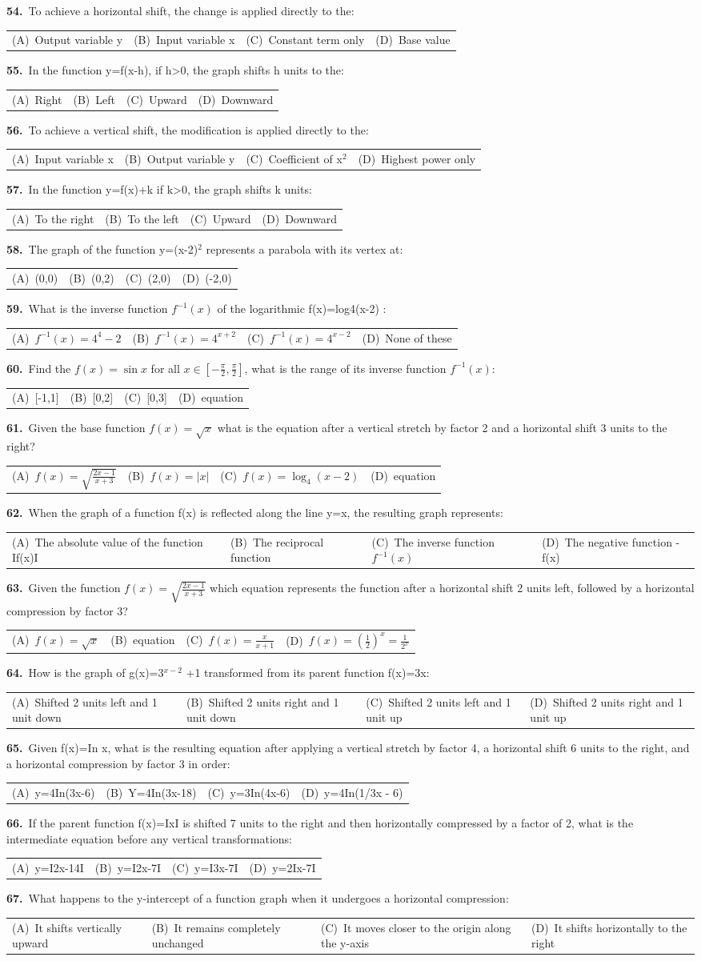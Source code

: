 \documentclass[11pt,a4paper]{article}
\makeatletter
\newcommand{\mcq}[6]{%
  \Needspace{4\baselineskip}%
  \par\medskip\noindent\textbf{#1.}\ #2\par\nopagebreak
  \noindent\begin{tabularx}{\linewidth}{@{\hspace{1.5em}}*{4}{>{\raggedright\arraybackslash}X}@{}}
    (A)~#3 & (B)~#4 & (C)~#5 & (D)~#6
  \end{tabularx}\par}
\makeatother
\begin{document}
\mcq{54}{To achieve a horizontal shift, the change is applied directly to the:}{Output variable y}{Input variable x}{Constant term only}{Base value}
\mcq{55}{In the function y=f(x-h), if h{>}0, the graph shifts h units to the:}{Right}{Left}{Upward}{Downward}
\mcq{56}{To achieve a vertical shift, the modification is applied directly to the:}{Input variable x}{Output variable y}{Coefficient of x$^{2}$}{Highest power only}
\mcq{57}{In the function y=f(x)+k if k{>}0, the graph shifts k units:}{To the right}{To the left}{Upward}{Downward}
\mcq{58}{The graph of the function y=(x-2)$^{2}$ represents a parabola with its vertex at:}{(0,0)}{(0,2)}{(2,0)}{(-2,0)}
\mcq{59}{What is the inverse function $f^{-1}(x)$ of the logarithmic f(x)=log4(x-2) :}{$f^{-1}(x)=4^{4}-2$}{$f^{-1}(x)=4^{x+2}$}{$f^{-1}(x)=4^{x-2}$}{None of these}
\mcq{60}{Find the $f(x)=\sin x$ for all $x\in\left[-\frac{\pi}{2},\frac{\pi}{2}\right]$, what is the range of its inverse function $f^{-1}(x)$:}{[-1,1]}{[0,2]}{[0,3]}{equation}
\mcq{61}{Given the base function $f(x)=\sqrt{x}$ what is the equation after a vertical stretch by factor 2 and a horizontal shift 3 units to the right?}{$f(x)=\sqrt{\frac{2x-1}{x+3}}$}{$f(x)=|x|$}{$f(x)=\log_{4}(x-2)$}{equation}
\mcq{62}{When the graph of a function f(x) is reflected along the line y=x, the resulting graph represents:}{The absolute value of the function If(x)I}{The reciprocal function}{The inverse function $f^{-1}(x)$}{The negative function -f(x)}
\mcq{63}{Given the function $f(x)=\sqrt{\frac{2x-1}{x+3}}$ which equation represents the function after a horizontal shift 2 units left, followed by a horizontal compression by factor 3?}{$f(x)=\sqrt{x}$}{equation}{$f(x)=\frac{x}{x+1}$}{$f(x)=\left(\frac{1}{2}\right)^{x}=\frac{1}{2^{x}}$}
\mcq{64}{How is the graph of g(x)=3$^{x-2}$ +1 transformed from its parent function f(x)=3x:}{Shifted 2 units left and 1 unit down}{Shifted 2 units right and 1 unit down}{Shifted 2 units left and 1 unit up}{Shifted 2 units right and 1 unit up}
\mcq{65}{Given f(x)=In x, what is the resulting equation after applying a vertical stretch by factor 4, a horizontal shift 6 units to the right, and a horizontal compression by factor 3 in order:}{y=4In(3x-6)}{Y=4In(3x-18)}{y=3In(4x-6)}{y=4In(1/3x - 6)}
\mcq{66}{If the parent function f(x)=IxI is shifted 7 units to the right and then horizontally compressed by a factor of 2, what is the intermediate equation before any vertical transformations:}{y=I2x-14I}{y=I2x-7I}{y=I3x-7I}{y=2Ix-7I}
\mcq{67}{What happens to the y-intercept of a function graph when it undergoes a horizontal compression:}{It shifts vertically upward}{It remains completely unchanged}{It moves closer to the origin along the y-axis}{It shifts horizontally to the right}
\end{document}
